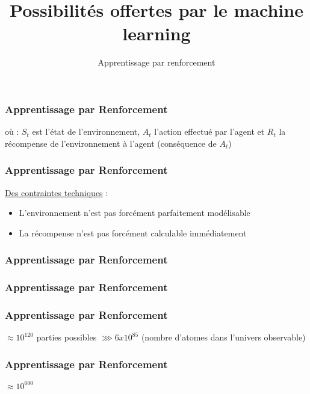 \documentclass{formation}
\title{Possibilités offertes par le machine learning}
\subtitle{Apprentissage par renforcement}
\begin{document}
\maketitle

\begin{frame}
  \frametitle{Apprentissage par Renforcement}
  où :
  \newline
  $S_t$ est l'état de l'environnement,
  \newline
  $A_t$ l'action effectué par l'agent et
  \newline
  $R_t$ la récompense de l'environnement à l'agent (conséquence de $A_t$)
\end{frame}

\begin{frame}
  \frametitle{Apprentissage par Renforcement}
  \underline{Des contraintes techniques} :
  \begin{itemize}
  \item L'environnement n'est pas forcément parfaitement modélisable
  \item La récompense n'est pas forcément calculable immédiatement
  \end{itemize}
\end{frame}

\begin{frame}
  \frametitle{Apprentissage par Renforcement}
\end{frame}

\begin{frame}
  \frametitle{Apprentissage par Renforcement}
  \begin{center}
  \end{center}
\end{frame}

\begin{frame}
  \frametitle{Apprentissage par Renforcement}
  \begin{center}
  \end{center}
  \begin{center}
    $\approx 10^{120}$ parties possibles $\ggg 6 x 10^{85}$
    \newline
    (nombre d'atomes dans l'univers observable)
  \end{center}
\end{frame}

\begin{frame}
  \frametitle{Apprentissage par Renforcement}
  \begin{center}
    \huge{$\approx 10^{600}$}
  \end{center}
\end{frame}
\end{document}
